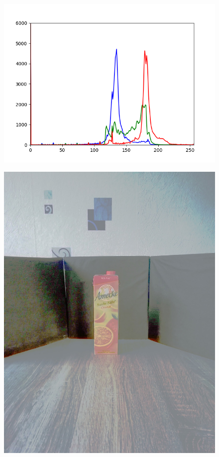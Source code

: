 \begin{appendices}
\begin{figure}[htb]
\begin{minipage}[c]{0.08\textwidth}
\end{minipage}
\hfill
\begin{minipage}[c]{0.3\textwidth}
\includegraphics[width=\textwidth]{Sources/Bild2_HS_histo.png}
\end{minipage}
\end{figure}
\begin{figure}[htb]
\begin{minipage}[c]{0.2\textwidth}
\includegraphics[width=\textwidth]{Sources/Bild3_HS.jpg}

\end{minipage}
\end{figure}
\end{appendices}
